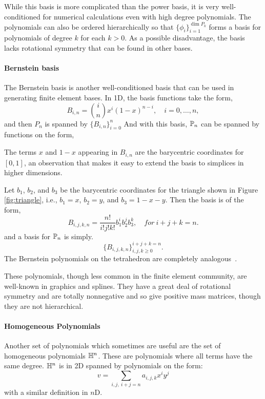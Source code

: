 While this basis is more complicated than the power basis, it is very
well-conditioned for numerical calculations even with high degree
polynomials.  The polynomials can also be ordered hierarchically so
that
\( \{ \phi_i \}_{i=1}^{\dim P_k} \) forms a basis for  polynomials of
degree \( k \) for each \( k > 0 \).  As a possible disadvantage, the
basis lacks rotational symmetry that can be found in  other bases.

\paragraph{Bernstein basis}
The Bernstein basis  is another well-conditioned basis that can be
used in generating finite element bases.
In 1D, the  basis functions take the  form,
\[
B_{i,n} = \binom{i}{n} x^i (1-x)^{n-i}, \quad i=0,\ldots,n,
\]
and then \( P_n \) is spanned by \( \{ B_{i,n} \}_{i=0}^n \)
And with this basis, $\P_n$ can be spanned by functions on the form,

The terms \( x \) and \( 1-x \) appearing in \( B_{i,n} \) are the
barycentric coordinates for \( [0,1] \), an observation that makes it
easy to extend the basis to simplices in higher dimensions.

Let $b_1$, $b_2$, and $b_3$ be the barycentric coordinates for
the triangle shown in Figure \ref{fig:triangle}, i.e.,
$b_1=x$, $b_2=y$, and $b_3=1-x-y$. Then the basis is
of the form,
\[
B_{i,j,k,n} = \frac{n!}{i!j!k!} b_1^i b_2^j b_3^k, \quad  for \ i+j+k=n .
\]
and a basis for $\P_n$ is simply.
\[
\{ B_{i,j,k,n} \}_{i,j,k\geq 0}^{i+j+k = n} .
\]
The Bernstein polynomials on the tetrahedron are completely
analogous~\cite{Schumaker}.

These polynomials, though less common in the finite element community,
are well-known in graphics and splines.  They have a great deal of
rotational symmetry and are totally nonnegative and so give positive
mass matrices, though they are not hierarchical.

\paragraph{Homogeneous Polynomials}
\label{sec:homo:pol}

Another set of polynomials which sometimes are useful are the set
of homogeneous polynomials $\H^n$. These are polynomials where all terms
have the same degree. $\H^n$ is in 2D spanned by polynomials on the
form:
\[
v = \sum_{i,j, \ i+j=n}
a_{i,j,k} x^i y^j
\]
with a similar definition in $n$D.



